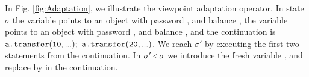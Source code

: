 % 


\jm[yes]{}

In Fig. \ref{fig:Adaptation}, we illustrate the viewpoint adaptation operator. In state $\sigma$ the variable  points to an 
object with password , and balance ,  the variable  points to an 
object with password , and balance , and the continuation is ${\texttt{a.transfer}}({\texttt{10}},...);$  ${\texttt{a.transfer}}({\texttt{20}},...)$. 
We reach $\sigma'$ by executing the first two statements from the continuation.
In $\sigma' \triangleleft \sigma$ we introduce the fresh variable , and replace  by  in the continuation.


